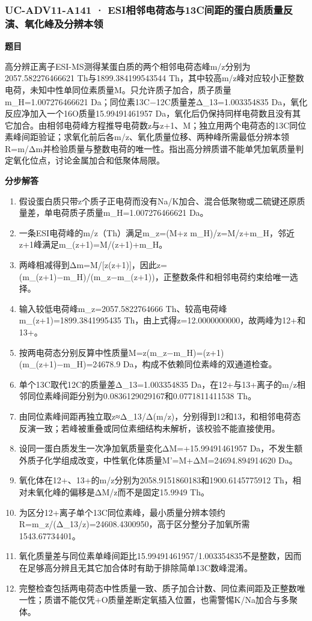 \documentclass[UTF8,11pt,a4paper]{ctexart}
\begin{document}
\subsubsection*{UC-ADV11-A141 · ESI相邻电荷态与13C间距的蛋白质质量反演、氧化峰及分辨本领}
\noindent\textbf{题目}\par
高分辨正离子ESI-MS测得某蛋白质的两个相邻电荷态峰m/z分别为2057.582276466621 Th与1899.384199543544 Th，其中较高m/z峰对应较小正整数电荷，未知中性单同位素质量M。只允许质子加合，质子质量m\_H=1.007276466621 Da；同位素13C−12C质量差Δ\_13=1.003354835 Da，氧化反应净加入一个16O质量15.99491461957 Da，氧化后仍保持同样电荷数且没有其它加合。由相邻电荷峰方程推导电荷数z与z+1、M；独立用两个电荷态的13C同位素峰间距验证；求氧化前后各m/z、氧化质量位移、两种峰所需最低分辨本领R=m/Δm并检验质量与整数电荷的唯一性。指出高分辨质谱不能单凭加氧质量判定氧化位点，讨论金属加合和低聚体局限。\par
\medskip\noindent\textbf{分步解答}
\begin{enumerate}
\item 假设蛋白质只带z个质子正电荷而没有Na/K加合、混合低聚物或二硫键还原质量差，单电荷质子质量m\_H=1.007276466621 Da。
\item 一条ESI电荷峰的m/z（Th）满足m\_z=(M+z m\_H)/z=M/z+m\_H，邻近z+1峰满足m\_(z+1)=M/(z+1)+m\_H。
\item 两峰相减得到Δm=M/[z(z+1)]，因此z=(m\_(z+1)−m\_H)/(m\_z−m\_(z+1))，正整数条件和相邻电荷约束给唯一选择。
\item 输入较低电荷峰m\_z=2057.5822764666 Th、较高电荷峰m\_(z+1)=1899.3841995435 Th，由上式得z=12.0000000000，故两峰为12+和13+。
\item 按两电荷态分别反算中性质量M=z(m\_z−m\_H)=(z+1)(m\_(z+1)−m\_H)=24678.9 Da，构成不依赖同位素峰的双通道检查。
\item 单个13C取代12C的质量差Δ\_13=1.003354835 Da，在12+与13+离子的m/z相邻同位素峰间距分别为0.0836129029167和0.0771811411538 Th。
\item 由同位素峰间距再独立取z≈Δ\_13/Δ(m/z)，分别得到12和13，和相邻电荷态反演一致；若峰被重叠或同位素细结构未解析，该校验不能直接使用。
\item 设同一蛋白质发生一次净加氧质量变化ΔM=+15.99491461957 Da，不发生额外质子化学组成改变，中性氧化体质量M'=M+ΔM=24694.894914620 Da。
\item 氧化体在12+、13+的m/z分别为2058.9151860183和1900.6145775912 Th，相对未氧化峰的偏移是ΔM/z而不是固定15.9949 Th。
\item 为区分12+离子单个13C同位素峰，最小质量分辨本领约R=m\_z/(Δ\_13/z)=24608.4300950，高于区分整分子加氧所需1543.67734401。
\item 氧化质量差与同位素单峰间距比15.99491461957/1.003354835不是整数，因而在足够高分辨且无其它加合体时有助于排除简单13C数峰混淆。
\item 完整检查包括两电荷态中性质量一致、质子加合计数、同位素间距及正整数唯一性；质谱不能仅凭+O质量差断定氧插入位置，也需警惕K/Na加合与多聚体。
\end{enumerate}
\end{document}
